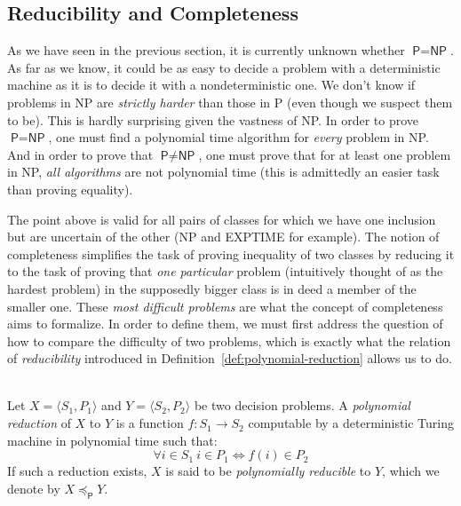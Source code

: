 \subsection{Reducibility and Completeness}

As we have seen in the previous section, it is currently unknown whether \(\textsf{P} = \textsf{NP}\). As far as we know, it could be as easy to decide a problem with a deterministic machine as it is to decide it with a nondeterministic one. We don't know if problems in \textsf{NP} are \emph{strictly harder} than those in \textsf{P} (even though we suspect them to be). This is hardly surprising given the vastness of \textsf{NP}. In order to prove \(\textsf{P} = \textsf{NP}\), one must find a polynomial time algorithm for \emph{every} problem in \textsf{NP}. And in order to prove that \(\textsf{P} \neq \textsf{NP}\), one must prove that for at least one problem in \textsf{NP}, \emph{all algorithms} are not polynomial time (this is admittedly an easier task than proving equality).

The point above is valid for all pairs of classes for which we have one inclusion but are uncertain of the other (\textsf{NP} and \textsf{EXPTIME} for example). The notion of completeness simplifies the task of proving inequality of two classes by reducing it to the task of proving that \emph{one particular} problem (intuitively thought of as the hardest problem) in the supposedly bigger class is in deed a member of the smaller one. These \emph{most difficult problems} are what the concept of completeness aims to formalize. In order to define them, we must first address the question of how to compare the difficulty of two problems, which is exactly what the relation of \emph{reducibility} introduced in Definition~\ref{def:polynomial-reduction} allows us to do.

\newcommand{\ple}{\preceq_\textsf{P}}
\begin{definition}\ \\
    \label{def:polynomial-reduction}
    Let \(X = \langle S_1, P_1\rangle\) and \(Y =\langle S_2, P_2\rangle\) be two decision problems. A \emph{polynomial reduction} of \(X\) to \(Y\) is a function \(f:S_1 \rightarrow S_2\) computable by a deterministic Turing machine in polynomial time such that:
    \[\forall i \in S_1\ i \in P_1 \iff f(i) \in P_2\]
    If such a reduction exists, \(X\) is said to be \emph{polynomially reducible} to \(Y\), which we denote by \(X \ple Y\).
\end{definition}

